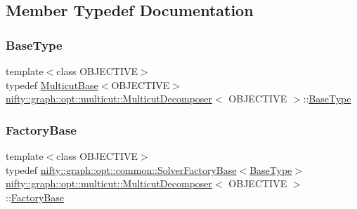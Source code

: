 \subsection{Member Typedef Documentation}
\mbox{\label{classnifty_1_1graph_1_1opt_1_1multicut_1_1MulticutDecomposer_add2ab66a4e322e5cf9b105e12d09f2f1}} 
\subsubsection{\texorpdfstring{Base\+Type}{BaseType}}
{\footnotesize\ttfamily template$<$class O\+B\+J\+E\+C\+T\+I\+VE$>$ \\
typedef \hyperlink{classnifty_1_1graph_1_1opt_1_1multicut_1_1MulticutBase}{Multicut\+Base}$<$O\+B\+J\+E\+C\+T\+I\+VE$>$ \hyperlink{classnifty_1_1graph_1_1opt_1_1multicut_1_1MulticutDecomposer}{nifty\+::graph\+::opt\+::multicut\+::\+Multicut\+Decomposer}$<$ O\+B\+J\+E\+C\+T\+I\+VE $>$\+::\hyperlink{classnifty_1_1graph_1_1opt_1_1multicut_1_1MulticutDecomposer_add2ab66a4e322e5cf9b105e12d09f2f1}{Base\+Type}}

\mbox{\label{classnifty_1_1graph_1_1opt_1_1multicut_1_1MulticutDecomposer_a0fb13bd2e6a0c561ae55b31deab53639}} 
\subsubsection{\texorpdfstring{Factory\+Base}{FactoryBase}}
{\footnotesize\ttfamily template$<$class O\+B\+J\+E\+C\+T\+I\+VE$>$ \\
typedef \hyperlink{classnifty_1_1graph_1_1opt_1_1common_1_1SolverFactoryBase}{nifty\+::graph\+::opt\+::common\+::\+Solver\+Factory\+Base}$<$\hyperlink{classnifty_1_1graph_1_1opt_1_1multicut_1_1MulticutDecomposer_add2ab66a4e322e5cf9b105e12d09f2f1}{Base\+Type}$>$ \hyperlink{classnifty_1_1graph_1_1opt_1_1multicut_1_1MulticutDecomposer}{nifty\+::graph\+::opt\+::multicut\+::\+Multicut\+Decomposer}$<$ O\+B\+J\+E\+C\+T\+I\+VE $>$\+::\hyperlink{classnifty_1_1graph_1_1opt_1_1multicut_1_1MulticutDecomposer_a0fb13bd2e6a0c561ae55b31deab53639}{Factory\+Base}}

